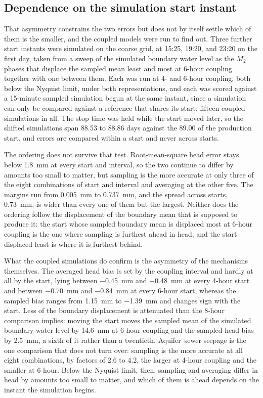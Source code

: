 \documentclass[preprint,authoryear,11pt]{elsarticle}
\begin{document}
\subsection{Dependence on the simulation start instant}

That asymmetry constrains the two errors but does not by itself settle which of them is the smaller, and the coupled models were run to find out. Three further start instants were simulated on the coarse grid, at 15:25, 19:20, and 23:20 on the first day, taken from a sweep of the simulated boundary water level as the $M_2$ phases that displace the sampled mean least and most at 6-hour coupling together with one between them. Each was run at 4- and 6-hour coupling, both below the Nyquist limit, under both representations, and each was scored against a 15-minute sampled simulation begun at the same instant, since a simulation can only be compared against a reference that shares its start: fifteen coupled simulations in all. The stop time was held while the start moved later, so the shifted simulations span 88.53 to 88.86 days against the 89.00 of the production start, and errors are compared within a start and never across starts.

The ordering does not survive that test. Root-mean-square head error stays below \SI{1.8}{\milli\meter} at every start and interval, so the two continue to differ by amounts too small to matter, but sampling is the more accurate at only three of the eight combinations of start and interval and averaging at the other five. The margins run from \SI{0.005}{\milli\meter} to \SI{0.737}{\milli\meter}, and the spread across starts, \SI{0.73}{\milli\meter}, is wider than every one of them but the largest. Neither does the ordering follow the displacement of the boundary mean that is supposed to produce it: the start whose sampled boundary mean is displaced most at 6-hour coupling is the one where sampling is furthest ahead in head, and the start displaced least is where it is furthest behind.

What the coupled simulations do confirm is the asymmetry of the mechanisms themselves. The averaged head bias is set by the coupling interval and hardly at all by the start, lying between \SI{-0.45}{\milli\meter} and \SI{-0.48}{\milli\meter} at every 4-hour start and between \SI{-0.70}{\milli\meter} and \SI{-0.84}{\milli\meter} at every 6-hour start, whereas the sampled bias ranges from \SI{1.15}{\milli\meter} to \SI{-1.39}{\milli\meter} and changes sign with the start. Less of the boundary displacement is attenuated than the 8-hour comparison implies: moving the start moves the sampled mean of the simulated boundary water level by \SI{14.6}{\milli\meter} at 6-hour coupling and the sampled head bias by \SI{2.5}{\milli\meter}, a sixth of it rather than a twentieth. Aquifer--sewer seepage is the one comparison that does not turn over: sampling is the more accurate at all eight combinations, by factors of 2.6 to 4.2, the larger at 4-hour coupling and the smaller at 6-hour. Below the Nyquist limit, then, sampling and averaging differ in head by amounts too small to matter, and which of them is ahead depends on the instant the simulation begins.
\end{document}
